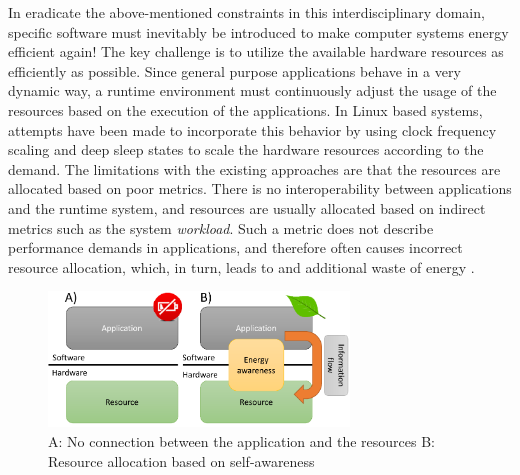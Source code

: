 \documentclass{article}
\begin{document}
In eradicate the above-mentioned constraints in this interdisciplinary domain, specific software must inevitably be introduced to make computer systems energy efficient again!
The key challenge is to utilize the available hardware resources as efficiently as possible.
Since general purpose applications behave in a very dynamic way, a runtime environment must continuously adjust the usage of the resources based on the execution of the applications.
In Linux based systems, attempts have been made to incorporate this behavior by using clock frequency scaling and deep sleep states to scale the hardware resources according to the demand. 
The limitations with the existing approaches are that the resources are allocated based on poor metrics.
There is no interoperability between applications and the runtime system, and resources are usually allocated based on indirect metrics such as the system \textit{workload}.
Such a metric does not describe performance demands in applications, and therefore often causes incorrect resource allocation,
which, in turn, leads to and additional waste of energy \cite{HolmbackaDasip, HolmbackaHipeac}.
\smallskip

\begin{figure}
    \includegraphics[width=8.0cm]{fig/EAS_Overview.png}
  \caption{A: No connection between the application and the resources B: Resource allocation based on self-awareness}
  \label{fig:EAS}
\end{figure}
\end{document}

